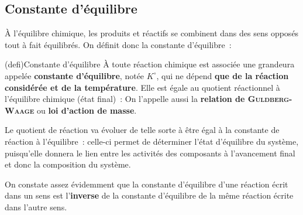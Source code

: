 \documentclass[../../main/main.tex]{subfiles}
\begin{document}
\subsection{Constante d'équilibre}
À l'équilibre chimique, les produits et réactifs se combinent dans des sens
opposés tout à fait équilibrés. On définit donc la constante d'équilibre~:

\begin{tcb*}[label=def:K](defi){Constante d'équilibre}
	À toute réaction chimique est associée une grandeura appelée \textbf{constante
		d'équilibre}, notée $K^\circ$, qui ne dépend \textbf{que de la réaction
		considérée et de la température}. Elle est égale au quotient réactionnel à
	l'équilibre chimique (état final)~:
	\psw{%
		\[
			\boxed{K^\circ = Q_{r, \eql}}
		\]
	}%
	On l'appelle aussi la \textbf{relation de \textsc{Guldberg-Waage}} ou
	\textbf{loi d'action de masse}.
\end{tcb*}

Le quotient de réaction va évoluer de telle sorte à être égal à la constante de
réaction à l'équilibre~: celle-ci permet de déterminer l'état d'équilibre du
système, puisqu'elle donnera le lien entre les activités des composants à
l'avancement final et donc la composition du système.

On constate assez évidemment que la constante d'équilibre d'une réaction écrit
dans un sens est l'\textbf{inverse} de la constante d'équilibre de la même
réaction écrite dans l'autre sens.
\end{document}
